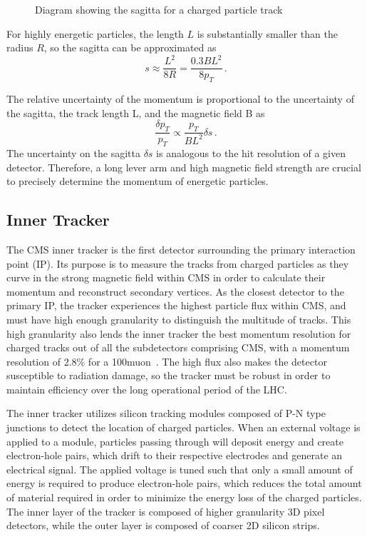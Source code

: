 \begin{figure}[htb!]
	\centering
	
	\caption{Diagram showing the sagitta for a charged particle track}
	\label{fig:sagitta}
\end{figure}

For highly energetic particles, the length $L$ is substantially smaller than the radius $R$, so the sagitta can be approximated as
\begin{equation} \label{eq:sagitta_approx}
	s\approx\frac{L^2}{8R}=\frac{0.3BL^2}{8p_T}\,.
\end{equation}

The relative uncertainty of the momentum is proportional to the uncertainty of the sagitta, the track length L, and the magnetic field B as
\begin{equation} \label{eq:dptOverpt}
	\frac{\delta p_T}{p_T}\propto\frac{p_T}{BL^2}\delta s\,.
\end{equation}
The uncertainty on the sagitta $\delta s$ is analogous to the hit resolution of a given detector. Therefore, a long lever arm and high magnetic field strength are crucial to precisely determine the momentum of energetic particles.

\subsection{Inner Tracker} \label{sec:CMS_tracker}
The CMS inner tracker is the first detector surrounding the primary interaction point (IP). Its purpose is to measure the tracks from charged particles as they curve in the strong magnetic field within CMS in order to calculate their momentum and reconstruct secondary vertices. As the closest detector to the primary IP, the tracker experiences the highest particle flux within CMS, and must have high enough granularity to distinguish the multitude of tracks. This high granularity also lends the inner tracker the best momentum resolution for charged tracks out of all the subdetectors comprising CMS, with a momentum resolution of 2.8\% for a 100\GeV muon~\cite{The_CMS_Collaboration_2014}. The high flux also makes the detector susceptible to radiation damage, so the tracker must be robust in order to maintain efficiency over the long operational period of the LHC. 

The inner tracker utilizes silicon tracking modules composed of P-N type junctions to detect the location of charged particles. When an external voltage is applied to a module, particles passing through will deposit energy and create electron-hole pairs, which drift to their respective electrodes and generate an electrical signal. The applied voltage is tuned such that only a small amount of energy is required to produce electron-hole pairs, which reduces the total amount of material required in order to minimize the energy loss of the charged particles. The inner layer of the tracker is composed of higher granularity 3D pixel detectors, while the outer layer is composed of coarser 2D silicon strips.

